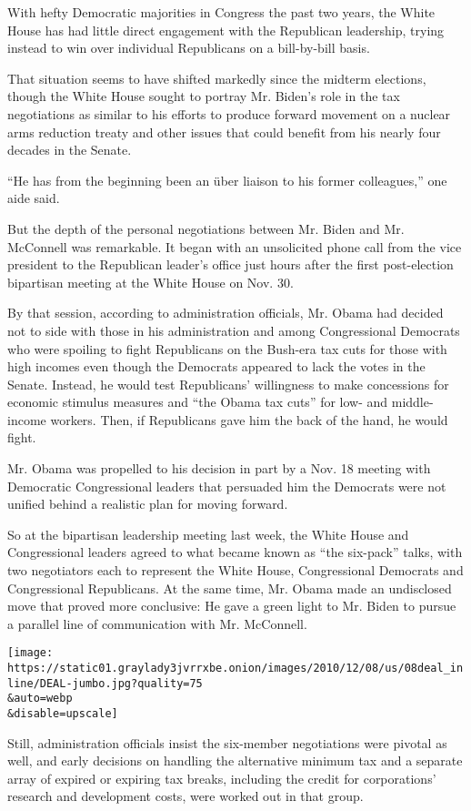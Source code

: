 With hefty Democratic majorities in Congress the past two years, the
White House has had little direct engagement with the Republican
leadership, trying instead to win over individual Republicans on a
bill-by-bill basis.

That situation seems to have shifted markedly since the midterm
elections, though the White House sought to portray Mr. Biden's role in
the tax negotiations as similar to his efforts to produce forward
movement on a nuclear arms reduction treaty and other issues that could
benefit from his nearly four decades in the Senate.

``He has from the beginning been an über liaison to his former
colleagues,'' one aide said.

But the depth of the personal negotiations between Mr. Biden and Mr.
McConnell was remarkable. It began with an unsolicited phone call from
the vice president to the Republican leader's office just hours after
the first post-election bipartisan meeting at the White House on Nov.
30.

By that session, according to administration officials, Mr. Obama had
decided not to side with those in his administration and among
Congressional Democrats who were spoiling to fight Republicans on the
Bush-era tax cuts for those with high incomes even though the Democrats
appeared to lack the votes in the Senate. Instead, he would test
Republicans' willingness to make concessions for economic stimulus
measures and ``the Obama tax cuts'' for low- and middle-income workers.
Then, if Republicans gave him the back of the hand, he would fight.

Mr. Obama was propelled to his decision in part by a Nov. 18 meeting
with Democratic Congressional leaders that persuaded him the Democrats
were not unified behind a realistic plan for moving forward.

So at the bipartisan leadership meeting last week, the White House and
Congressional leaders agreed to what became known as ``the six-pack''
talks, with two negotiators each to represent the White House,
Congressional Democrats and Congressional Republicans. At the same time,
Mr. Obama made an undisclosed move that proved more conclusive: He gave
a green light to Mr. Biden to pursue a parallel line of communication
with Mr. McConnell.

\texttt{[image: https://static01.graylady3jvrrxbe.onion/images/2010/12/08/us/08deal\_inline/DEAL-jumbo.jpg?quality=75\\\&auto=webp\\\&disable=upscale]}

Still, administration officials insist the six-member negotiations were
pivotal as well, and early decisions on handling the alternative minimum
tax and a separate array of expired or expiring tax breaks, including
the credit for corporations' research and development costs, were worked
out in that group.

